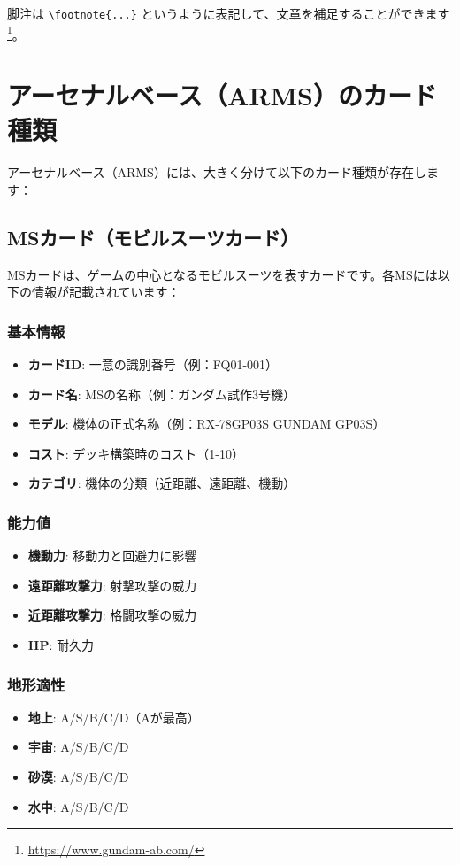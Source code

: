 \documentclass[a4paper,11pt]{jsarticle}
\begin{document}
脚注は \verb=\footnote{...}= というように表記して、文章を補足することができます\footnote{\url{https://www.gundam-ab.com/}}。

\section*{アーセナルベース（ARMS）のカード種類}

アーセナルベース（ARMS）には、大きく分けて以下のカード種類が存在します：

\subsection*{MSカード（モビルスーツカード）}

MSカードは、ゲームの中心となるモビルスーツを表すカードです。各MSには以下の情報が記載されています：

\subsubsection*{基本情報}
\begin{itemize}
    \item \textbf{カードID}: 一意の識別番号（例：FQ01-001）
    \item \textbf{カード名}: MSの名称（例：ガンダム試作3号機）
    \item \textbf{モデル}: 機体の正式名称（例：RX-78GP03S GUNDAM GP03S）
    \item \textbf{コスト}: デッキ構築時のコスト（1-10）
    \item \textbf{カテゴリ}: 機体の分類（近距離、遠距離、機動）
\end{itemize}

\subsubsection*{能力値}
\begin{itemize}
    \item \textbf{機動力}: 移動力と回避力に影響
    \item \textbf{遠距離攻撃力}: 射撃攻撃の威力
    \item \textbf{近距離攻撃力}: 格闘攻撃の威力
    \item \textbf{HP}: 耐久力
\end{itemize}

\subsubsection*{地形適性}
\begin{itemize}
    \item \textbf{地上}: A/S/B/C/D（Aが最高）
    \item \textbf{宇宙}: A/S/B/C/D
    \item \textbf{砂漠}: A/S/B/C/D
    \item \textbf{水中}: A/S/B/C/D
\end{itemize}
\end{document}

